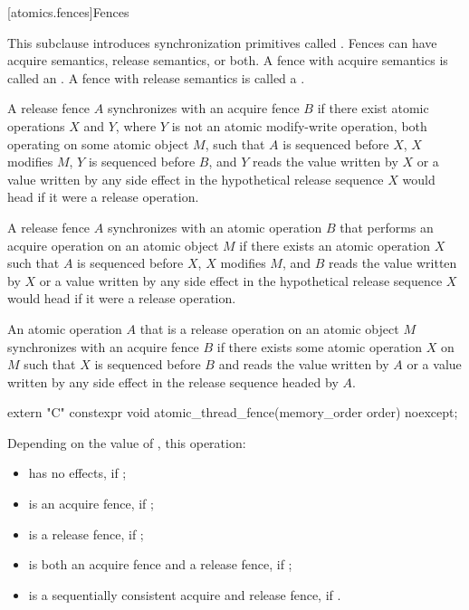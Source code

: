 [atomics.fences]{Fences}

\pnum
This subclause introduces synchronization primitives called . Fences can have
acquire semantics, release semantics, or both. A fence with acquire semantics is called
an . A fence with release semantics is called a .

\pnum
A release fence $A$ synchronizes with an acquire fence $B$ if there exist
atomic operations $X$ and $Y$,
where $Y$ is not an atomic modify-write operation,
both operating on some atomic object
$M$, such that $A$ is sequenced before $X$, $X$ modifies
$M$, $Y$ is sequenced before $B$, and $Y$ reads the value
written by $X$ or a value written by any side effect in the hypothetical release
sequence $X$ would head if it were a release operation.

\pnum
A release fence $A$ synchronizes with an atomic operation $B$ that
performs an acquire operation on an atomic object $M$ if there exists an atomic
operation $X$ such that $A$ is sequenced before $X$, $X$
modifies $M$, and $B$ reads the value written by $X$ or a value
written by any side effect in the hypothetical release sequence $X$ would head if
it were a release operation.

\pnum
An atomic operation $A$ that is a release operation on an atomic object
$M$ synchronizes with an acquire fence $B$ if there exists some atomic
operation $X$ on $M$ such that $X$ is sequenced before $B$
and reads the value written by $A$ or a value written by any side effect in the
release sequence headed by $A$.

%
\begin{itemdecl}
extern "C" constexpr void atomic_thread_fence(memory_order order) noexcept;
\end{itemdecl}

\begin{itemdescr}
\pnum
\effects
Depending on the value of , this operation:
\begin{itemize}
\item has no effects, if ;

\item is an acquire fence, if ;

\item is a release fence, if ;

\item is both an acquire fence and a release fence, if ;

\item is a sequentially consistent acquire and release fence, if .
\end{itemize}
\end{itemdescr}

